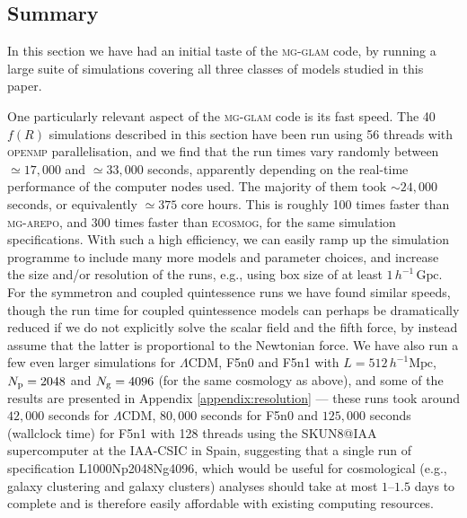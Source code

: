 \subsection{Summary}
\label{subsect:cosmo_runs_summary}

In this section we have had an initial taste of the \textsc{mg-glam} code, by running a large suite of simulations covering all three classes of models studied in this paper.

One particularly relevant aspect of the \textsc{mg-glam} code is its fast speed. The 40 $f(R)$ simulations described in this section have been run using 56 threads with \textsc{openmp} parallelisation, and we find that the run times vary randomly between $\simeq17,000$ and $\simeq33,000$ seconds, apparently depending on the real-time performance of the computer nodes used. The majority of them took $\sim24,000$ seconds, or equivalently $\simeq375$ core hours. This is roughly 100 times faster than \textsc{mg-arepo}, and $300$ times faster than \textsc{ecosmog}, for the same simulation specifications. With such a high efficiency, we can easily ramp up the simulation programme to include many more models and parameter choices, and increase the size and/or resolution of the runs, e.g., using box size of at least $1 \, h^{-1} \, \mathrm{Gpc}$. For the symmetron and coupled quintessence runs we have found similar speeds, though the run time for coupled quintessence models can perhaps be dramatically reduced if we do not explicitly solve the scalar field and the fifth force, by instead assume that the latter is proportional to the Newtonian force. We have also run a few even larger simulations for $\Lambda$CDM, F5n0 and F5n1 with $L = 512 \, h^{-1}\mathrm{Mpc}$, $N_{\rm p}=2048$ and $N_{\rm g}=4096$ (for the same cosmology as above), and some of the results are presented in Appendix \ref{appendix:resolution} --- these runs took around $42,000$ seconds for $\Lambda$CDM, $80,000$ seconds for F5n0 and $125,000$ seconds (wallclock time) for F5n1 with 128 threads using the SKUN8@IAA supercomputer at the IAA-CSIC in Spain, suggesting that a single run of specification L1000Np2048Ng4096, which would be useful for cosmological (e.g., galaxy clustering and galaxy clusters) analyses should take at most $1$--$1.5$ days to complete and is therefore easily affordable with existing computing resources.

